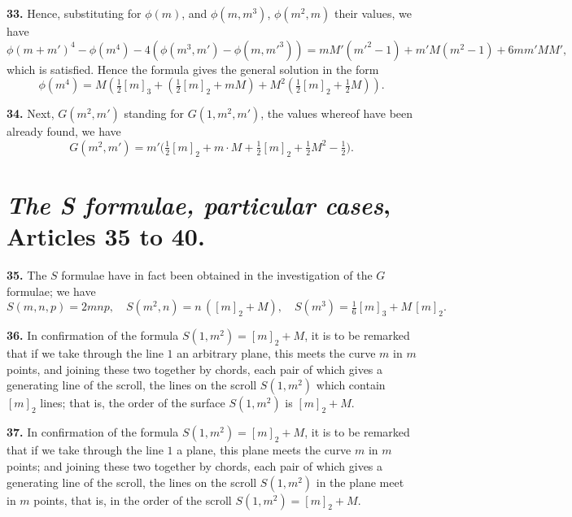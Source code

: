 \documentclass[11pt,a4paper]{article}
\begin{document}
\medskip

\textbf{33.} Hence, substituting for $\phi(m)$, and $\phi(m, m^3)$, $\phi(m^2, m)$ their values, we have
\[
\phi(m + m')^4 - \phi(m^4) - 4(\phi(m^3, m') - \phi(m, m'^3)) = m M' (m'^2 - 1) + m' M (m^2 - 1) + 6 m m' M M',
\]
which is satisfied. Hence the formula gives the general solution in the form
\[
\phi(m^4) = M(\tfrac{1}{2}[m]_3 + (\tfrac{1}{2}[m]_2 + m M) + M^2 (\tfrac{1}{2}[m]_2 + \tfrac{1}{2} M)).
\]

\medskip

\textbf{34.} Next, $G(m^2, m')$ standing for $G(1, m^2, m')$, the values whereof have been already found, we have
\[
G(m^2, m') = m'\bigl(\tfrac{1}{2}[m]_2 + m \cdot M + \tfrac{1}{2}[m]_2 + \tfrac{1}{2}M^2 - \tfrac{1}{2}\bigr).
\]

\section*{\textit{The S formulae, particular cases}, Articles 35 to 40.}

\textbf{35.} The $S$ formulae have in fact been obtained in the investigation of the $G$ formulae; we have
\[
S(m, n, p) = 2mnp,\quad S(m^2, n) = n\,([m]_2 + M),\quad S(m^3) = \tfrac{1}{6}[m]_3 + M\,[m]_2.
\]

\medskip

\textbf{36.} In confirmation of the formula $S(1, m^2) = [m]_2 + M$, it is to be remarked that if we take through the line $1$ an arbitrary plane, this meets the curve $m$ in $m$ points, and joining these two together by chords, each pair of which gives a generating line of the scroll, the lines on the scroll $S(1, m^2)$ which contain $[m]_2$ lines; that is, the order of the surface $S(1, m^2)$ is $[m]_2 + M$.

\medskip

\textbf{37.} In confirmation of the formula $S(1, m^2) = [m]_2 + M$, it is to be remarked that if we take through the line $1$ a plane, this plane meets the curve $m$ in $m$ points; and joining these two together by chords, each pair of which gives a generating line of the scroll, the lines on the scroll $S(1, m^2)$ in the plane meet in $m$ points, that is, in the order of the scroll $S(1, m^2) = [m]_2 + M$.

\medskip
\end{document}

